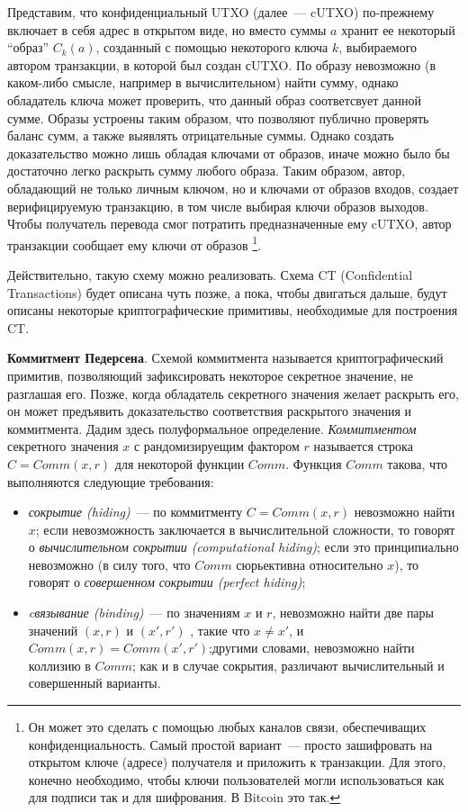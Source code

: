 \documentclass{article}
\begin{document}
  Представим, что конфиденциальный UTXO (далее~--- cUTXO) по-прежнему включает
  в себя адрес в открытом виде,
 но вместо суммы $a$ хранит ее некоторый ``образ'' $C_k(a)$,
 созданный с помощью некоторого ключа $k$, выбираемого автором транзакции, в которой был создан сUTXO.
 По образу невозможно (в каком-либо смысле, например в вычислительном) найти сумму,
 однако обладатель ключа может проверить, что данный образ соответсвует данной сумме.
 Образы устроены таким образом, что позволяют публично проверять баланс сумм,
 а также выявлять отрицательные суммы.
 Однако создать доказательство можно лишь обладая ключами от образов,
 иначе можно было бы достаточно легко раскрыть сумму любого образа.
 Таким образом, автор, обладающий не только личным ключом, но и ключами от образов входов,
  создает верифицируемую транзакцию, в том числе выбирая ключи образов выходов.
 Чтобы получатель перевода смог потратить предназначенные ему cUTXO,
 автор транзакции сообщает ему ключи от образов
 \footnote{Он может это сделать с помощью любых каналов связи, обеспечиващих конфиденциальность.
 Самый простой вариант~--- просто зашифровать на открытом ключе (адресе) получателя и приложить к транзакции.
 Для этого, конечно необходимо, чтобы ключи пользователей могли использоваться как для подписи так и для шифрования.
 В Bitcoin это так.}.

Действительно, такую схему можно реализовать. Схема CT (Confidential Transactions)
будет описана чуть позже, а пока, чтобы двигаться дальше,
будут описаны некоторые криптографические примитивы, необходимые для построения CT.

{\bf Коммитмент Педерсена}.
Схемой коммитмента называется криптографический примитив, позволяющий зафиксировать
некоторое секретное значение, не разглашая его.
Позже, когда обладатель секретного значения желает раскрыть его,
он может предъявить доказательство соответствия раскрытого значения и коммитмента.
Дадим здесь полуформальное определение.
\textit{Коммитментом} секретного значения $x$ с рандомизируещим фактором $r$
называется строка $C = Comm(x, r)$ для некоторой функции $Comm$.
Функция $Comm$ такова,
 что выполняются следующие требования:
\begin{itemize}
  \item
   \textit{сокрытие (hiding)}~--- по коммитменту $C = Comm(x,r)$ невозможно найти $x$;
   если невозможность заключается в вычислительной сложности, то говорят о
   \textit{вычислительном сокрытии (computational hiding)};
   если это принципиально невозможно (в силу того, что $Comm$ сюрьективна
   относительно $x$), то говорят о \textit{совершенном сокрытии (perfect hiding)};
  \item
  \textit{cвязывание (binding)}~--- по значениям $x$ и $r$,
  невозможно найти две пары значений $(x, r)$ и $(x', r')$ , такие что $x \neq x'$,
  и $Comm(x,r) = Comm(x', r')$;другими словами, невозможно найти коллизию в $Comm$;
  как и в случае сокрытия, различают вычислительный и совершенный варианты.
\end{itemize}
\end{document}
